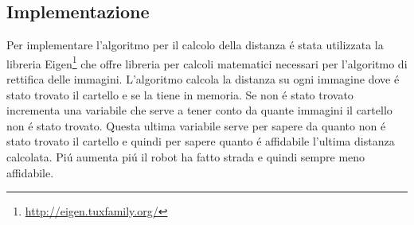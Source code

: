 	\subsection{Implementazione}
		Per implementare l'algoritmo per il calcolo della distanza \'e stata utilizzata la libreria Eigen\footnote{\url{ http://eigen.tuxfamily.org/}} che offre libreria per calcoli matematici necessari per l'algoritmo di rettifica delle immagini.\newline
		L'algoritmo calcola la distanza su ogni immagine dove \'e stato trovato il cartello e se la tiene in memoria. Se non \'e stato trovato incrementa una variabile che serve a tener conto da quante immagini il cartello non \'e stato trovato. Questa ultima variabile serve per sapere da quanto non \'e stato trovato il cartello e quindi per sapere quanto \'e affidabile l'ultima distanza calcolata. Pi\'u aumenta pi\'u il robot ha fatto strada e quindi sempre meno affidabile.

